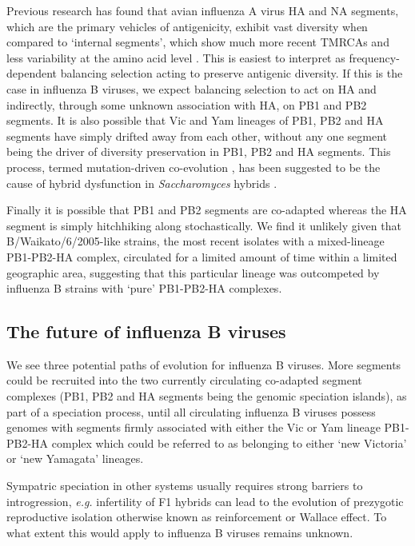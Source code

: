 \documentclass[11pt,oneside,letterpaper]{article}
\begin{document}
Previous research has found that avian influenza A virus HA and NA segments, which are the primary vehicles of antigenicity, exhibit vast diversity when compared to `internal segments', which show much more recent TMRCAs and less variability at the amino acid level \cite{chen2006,obenauer2006}.
This is easiest to interpret as frequency-dependent balancing selection acting to preserve antigenic diversity.
If this is the case in influenza B viruses, we expect balancing selection to act on HA and indirectly, through some unknown association with HA, on PB1 and PB2 segments.
It is also possible that Vic and Yam lineages of PB1, PB2 and HA segments have simply drifted away from each other, without any one segment being the driver of diversity preservation in PB1, PB2 and HA segments.
This process, termed mutation-driven co-evolution \cite{presgraves2010}, has been suggested to be the cause of hybrid dysfunction in \textit{Saccharomyces} hybrids \cite{lee2008}.

Finally it is possible that PB1 and PB2 segments are co-adapted whereas the HA segment is simply hitchhiking along stochastically. 
We find it unlikely given that B/Waikato/6/2005-like strains, the most recent isolates with a mixed-lineage PB1-PB2-HA complex, circulated for a limited amount of time within a limited geographic area, suggesting that this particular lineage was outcompeted by influenza B strains with `pure' PB1-PB2-HA complexes.

\subsection*{The future of influenza B viruses}
We see three potential paths of evolution for influenza B viruses.
More segments could be recruited into the two currently circulating co-adapted segment complexes (PB1, PB2 and HA segments being the genomic speciation islands), as part of a speciation process, until all circulating influenza B viruses possess genomes with segments firmly associated with either the Vic or Yam lineage PB1-PB2-HA complex which could be referred to as belonging to either `new Victoria' or `new Yamagata' lineages.

Sympatric speciation in other systems usually requires strong barriers to introgression, \textit{e.g.} infertility of F1 hybrids can lead to the evolution of prezygotic reproductive isolation otherwise known as reinforcement or Wallace effect.
To what extent this would apply to influenza B viruses remains unknown.
\end{document}
